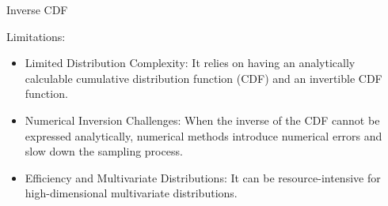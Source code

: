 \documentclass{beamer}
\begin{document}
\begin{section}{Inverse CDF}
    \begin{frame}{Limitations:}
        \begin{itemize}
            \item Limited Distribution Complexity: It relies on having an analytically calculable cumulative distribution function (CDF) and an invertible CDF function. 
            \item Numerical Inversion Challenges: When the inverse of the CDF cannot be expressed analytically, numerical methods introduce numerical errors and slow down the sampling process.
            \item Efficiency and Multivariate Distributions: It can be resource-intensive for high-dimensional multivariate distributions. 
        \end{itemize}
    \end{frame}
\end{section}
\end{document}
